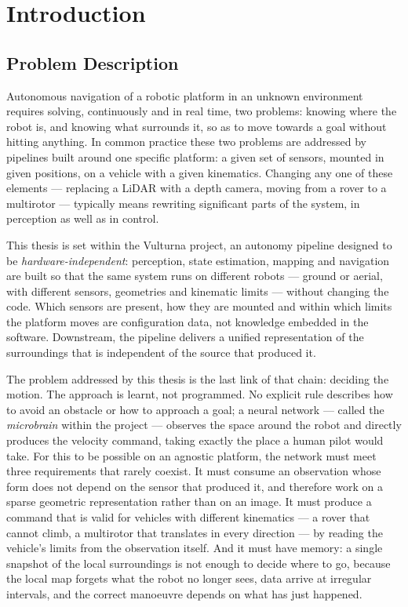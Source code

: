 \chapter{Introduction}
\label{ch:introduction}

\section{Problem Description}

Autonomous navigation of a robotic platform in an unknown environment requires
solving, continuously and in real time, two problems: knowing where the robot is,
and knowing what surrounds it, so as to move towards a goal without hitting
anything. In common practice these two problems are addressed by pipelines built
around one specific platform: a given set of sensors, mounted in given positions,
on a vehicle with a given kinematics. Changing any one of these elements ---
replacing a LiDAR with a depth camera, moving from a rover to a multirotor ---
typically means rewriting significant parts of the system, in perception as well
as in control.

This thesis is set within the Vulturna project, an autonomy pipeline designed
to be \emph{hardware-independent}: perception, state estimation, mapping and
navigation are built so that the same system runs on different robots --- ground
or aerial, with different sensors, geometries and kinematic limits --- without
changing the code. Which sensors are present, how they are mounted and within
which limits the platform moves are configuration data, not knowledge embedded
in the software. Downstream, the pipeline delivers a unified representation of
the surroundings that is independent of the source that produced it.

The problem addressed by this thesis is the last link of that chain: deciding
the motion. The approach is learnt, not programmed. No explicit rule describes
how to avoid an obstacle or how to approach a goal; a neural network --- called
the \emph{microbrain} within the project --- observes the space around the robot
and directly produces the velocity command, taking exactly the place a human
pilot would take. For this to be possible on an agnostic platform, the network
must meet three requirements that rarely coexist. It must consume an observation
whose form does not depend on the sensor that produced it, and therefore work on
a sparse geometric representation rather than on an image. It must produce a
command that is valid for vehicles with different kinematics --- a rover that
cannot climb, a multirotor that translates in every direction --- by reading the
vehicle's limits from the observation itself. And it must have memory: a single
snapshot of the local surroundings is not enough to decide where to go, because
the local map forgets what the robot no longer sees, data arrive at irregular
intervals, and the correct manoeuvre depends on what has just happened.

